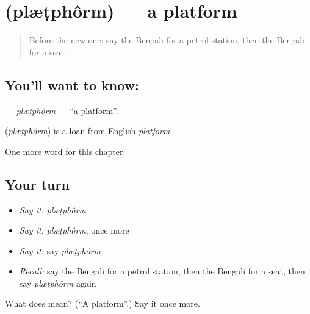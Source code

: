 \section[\texorpdfstring{\bn{প্ল্যাটফর্ম} (plæṭphôrm)}{প্ল্যাটফর্ম (plæṭphôrm)}]{ (plæṭphôrm) — a platform}

\label{lesson:BN-C198-pltphorm}



\begin{quote}
Before the new one: say the Bengali for a petrol station, then the Bengali for a seat.
\end{quote}

\subsection*{You'll want to know: }
\textbf{} — \emph{plæṭphôrm} — \textquotedblleft{}a platform\textquotedblright{}.

\begin{cousinweb}
\textbf{} (\emph{plæṭphôrm}) is a loan from English \emph{platform}.
\end{cousinweb}

\begin{grammarlens}[title={What you've built}]
One more word for this chapter.
\end{grammarlens}

\subsection*{Your turn}
\begin{itemize}
\raggedright
  \item \emph{Say it:} \emph{plæṭphôrm}
  \item \emph{Say it:} \emph{plæṭphôrm}, once more
  \item \emph{Say it:} say \emph{plæṭphôrm}
  \item \emph{Recall:} say the Bengali for a petrol station, then the Bengali for a seat, then say \emph{plæṭphôrm} again
\end{itemize}

\begin{tcolorbox}[breakable,colback=teal!4,colframe=teal!35!black,title={Before you move on}]
What does  mean? (\textquotedblleft{}A platform\textquotedblright{}.) Say it once more.
\end{tcolorbox}
